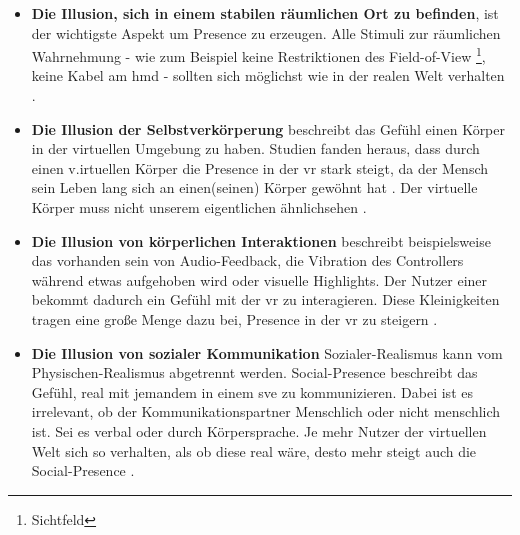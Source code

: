 \documentclass[a4paper,11pt]{article}%
\renewcommand{\\}{\vspace*{0.5\baselineskip} \newline}
\begin{document}
\begin{itemize}
	\item{\textbf{Die Illusion, sich in einem stabilen räumlichen Ort zu befinden}}, ist der wichtigste Aspekt um Presence zu erzeugen. Alle Stimuli zur räumlichen Wahrnehmung - wie zum Beispiel keine Restriktionen des \dq{}Field-of-View\dq{} \footnote{Sichtfeld}, keine Kabel am \ac{hmd} - sollten sich möglichst wie in der realen Welt verhalten \citep[p.47]{jerald2015vr}.
	\item{\textbf{Die Illusion der Selbstverkörperung}} beschreibt das Gefühl einen Körper in der virtuellen Umgebung zu haben. Studien fanden heraus, dass durch einen v.irtuellen Körper die \dq{}Presence\dq{} in der \ac{vr} stark steigt, da der Mensch sein Leben lang sich an einen(seinen) Körper gewöhnt hat \citep[p.756]{botvinick1998rubber}. Der virtuelle Körper muss nicht unserem eigentlichen ähnlichsehen \citep[p.7]{maxwell1960psycho}.
	\item{\textbf{Die Illusion von körperlichen Interaktionen}} beschreibt beispielsweise das vorhanden sein von Audio-Feedback, die Vibration des Controllers während etwas aufgehoben wird oder visuelle Highlights. Der Nutzer einer bekommt dadurch ein Gefühl mit der \ac{vr} zu interagieren. Diese Kleinigkeiten tragen eine große Menge dazu bei, \dq{}Presence \dq{} in der \ac{vr} zu steigern \citep[p.48]{jerald2015vr}.
	\item{\textbf{Die Illusion von sozialer Kommunikation}} Sozialer-Realismus kann vom Physischen-Realismus abgetrennt werden. \dq{}Social-Presence\dq{} beschreibt das Gefühl, real mit jemandem in einem \ac{sve} zu kommunizieren. Dabei ist es irrelevant, ob der Kommunikationspartner Menschlich oder nicht menschlich ist. Sei es verbal oder durch Körpersprache. Je mehr Nutzer der virtuellen Welt sich so verhalten, als ob diese real wäre, desto mehr steigt auch die \dq{}Social-Presence\dq{} \citep[p.49]{jerald2015vr} \citep[p.12]{guadagno2007virtual}.
\end{itemize}

\end{document}
